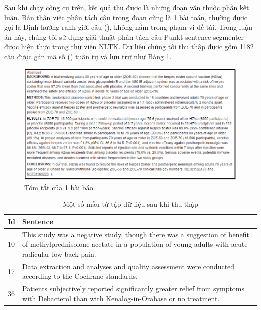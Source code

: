 Sau khi chạy công cụ trên, kết quả thu được là những đoạn văn thuộc phần kết luận. Bản thân việc phân tách câu trong đoạn cũng là 1 bài toán, thường được gọi là Định hướng ranh giới câu (), không nằm trong phạm vi đề tài. Trong luận án này, chúng tôi sử dụng giải thuật phân tách câu Punkt sentence segmenter \cite{kiss2006unsupervised} được hiện thực trong thư viện NLTK. Dữ liệu chúng tôi thu thập được gồm 1182 câu được gán mã số () tuần tự và lưu trữ như Bảng \ref{table:data}.
\begin{figure}[H]
\centering
\includegraphics[scale=0.7]{../hinh/bai_bao_mau.png}
\caption{Tóm tắt của 1 bài báo} \label{fig:bai-bao-mau}
\end{figure}

\begin{table}[H]
\centering
\begin{minipage}{1.0\textwidth}
\caption{Một số mẫu từ tập dữ liệu sau khi thu thập} \label{table:data}
\begin{tabular}{|l| m{} | } 
\hline
\textbf{Id} & \textbf{Sentence} \\ \hline
10 & This study was a negative study, though there was a suggestion of benefit of methylprednisolone acetate in a population of young adults with acute radicular low back pain. \\ \hline
17 & Data extraction and analyses and quality assessment were conducted according to the Cochrane standards. \\ \hline
36 & Patients subjectively reported significantly greater relief from symptoms with Debacterol than with Kenalog-in-Orabase or no treatment. \\ \hline
\end{tabular}
\end{minipage}
\end{table}

